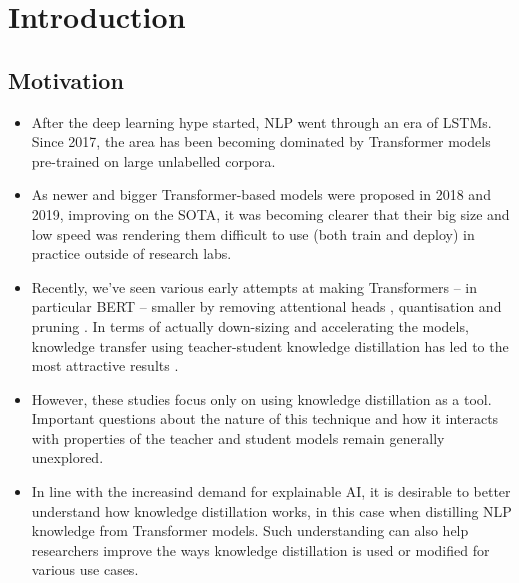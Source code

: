 \documentclass[bsc,frontabs,twoside,singlespacing,parskip,deptreport]{infthesis}
\begin{document}
\chapter{Introduction}{
  \section{Motivation}{
    \begin{itemize}
      \item After the deep learning hype started, NLP went through an era of LSTMs. Since 2017, the area has been becoming dominated by Transformer models pre-trained on large unlabelled corpora.
      \item As newer and bigger Transformer-based models were proposed in 2018 and 2019, improving on the SOTA, it was becoming clearer that their big size and low speed was rendering them difficult to use (both train and deploy) in practice outside of research labs.
      \item Recently, we've seen various early attempts at making Transformers -- in particular BERT \citep{Devlin_2018} -- smaller by removing attentional heads \citep{Michel_2019}, quantisation and pruning \citep{Cheong_2019, Sucik_2019}. In terms of actually down-sizing and accelerating the models, knowledge transfer using teacher-student knowledge distillation has led to the most attractive results \citep{Mukherjee_2019,Tang-et-al-2019a,Jiao_2019,Sanh_2019}.
      \item However, these studies focus only on using knowledge distillation as a tool. Important questions about the nature of this technique and how it interacts with properties of the teacher and student models remain generally unexplored.
      \item In line with the increasind demand for explainable AI, it is desirable to better understand how knowledge distillation works, in this case when distilling NLP knowledge from Transformer models. Such understanding can also help researchers improve the ways knowledge distillation is used or modified for various use cases.
    \end{itemize}
  }
  
}
\end{document}
